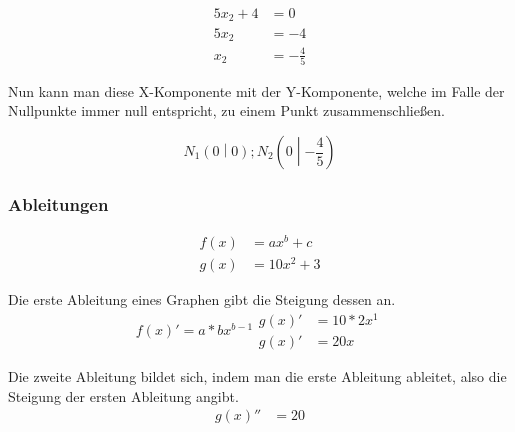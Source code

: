 \documentclass[a4paper]{article}
\begin{document}
				\begin{equation}
					\begin{split}
						5x_2 + 4 &= 0\\
						5x_2 &= -4\\
						x_2 &= -\frac{4}{5}
					\end{split}
				\end{equation}
				
				\noindent
				Nun kann man diese X-Komponente mit der Y-Komponente, welche im Falle der Nullpunkte immer null entspricht, zu einem Punkt zusammenschließen.
				
				\begin{equation}
					N_1\left(0\middle|0\right); 
					N_2\left(0\middle|-\frac{4}{5}\right)
				\end{equation}
				
			\subsubsection{Ableitungen}
				\begin{equation}
					\begin{split}
						f(x) &= ax^b + c\\
						g(x) &= 10x^2 + 3
					\end{split}
				\end{equation}
				
				Die erste Ableitung eines Graphen gibt die Steigung dessen an.
				\begin{subequations}
					\begin{equation}
						f(x)' = a * bx^{b-1}
					\end{equation}
					\begin{equation}
						\begin{split}
							g(x)' &= 10*2x^1\\
							g(x)' &= 20x\label{abl:first}
						\end{split}
					\end{equation}
				\end{subequations}
				
				Die zweite Ableitung bildet sich, indem man die erste Ableitung ableitet, also die Steigung der ersten Ableitung angibt.
				\begin{equation}
					\begin{split}
						g(x)'' &= 20\label{abl:second}
					\end{split}
				\end{equation}
				
\end{document}
